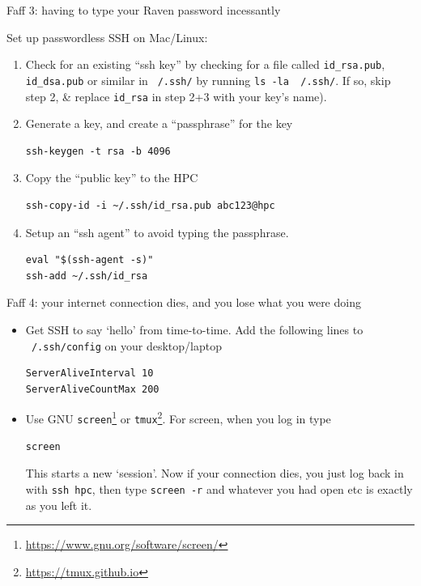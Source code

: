 \documentclass[t,10pt]{beamer}
\let\oldfootnote\footnote
\renewcommand\footnote[1][]{\oldfootnote[frame,#1]}
\begin{document}
\begin{frame}[fragile]{Faff 3: having to type your Raven password incessantly}

Set up \alert{passwordless SSH} on Mac/Linux:
\begin{enumerate}
\item Check for an existing ``ssh key'' by checking for a file called \texttt{id_rsa.pub}, \texttt{id_dsa.pub} or similar in \texttt{~/.ssh/} by running \texttt{ls -la ~/.ssh/}. If so, skip step 2, \& replace \texttt{id_rsa} in step 2+3 with your key's name).

\item Generate a key, and create a ``passphrase'' for the key
\begin{verbatim}
ssh-keygen -t rsa -b 4096
\end{verbatim}

\item Copy the ``public key'' to the HPC
\begin{verbatim}
ssh-copy-id -i ~/.ssh/id_rsa.pub abc123@hpc
\end{verbatim}

\item Setup an ``ssh agent'' to avoid typing the passphrase.
\begin{verbatim}
eval "$(ssh-agent -s)"
ssh-add ~/.ssh/id_rsa
\end{verbatim}
\end{enumerate}

\end{frame}

\begin{frame}[fragile]{Faff 4: your internet connection dies, and you lose what you were doing}

\begin{itemize}
\item Get SSH to say `hello' from time-to-time. Add the following lines to \texttt{~/.ssh/config} on your desktop/laptop

\begin{verbatim}
ServerAliveInterval 10
ServerAliveCountMax 200
\end{verbatim}

\item Use GNU \texttt{screen}\footnote{\url{https://www.gnu.org/software/screen/}} or \texttt{tmux}\footnote{\url{https://tmux.github.io}}.
For screen, when you log in type
\begin{verbatim}
screen
\end{verbatim}

This starts a new `session'. Now if your connection dies, you just log back in with \texttt{ssh hpc}, then type \texttt{screen -r} and whatever you had open etc is exactly as you left it.
\end{itemize}
\end{frame}
\end{document}
